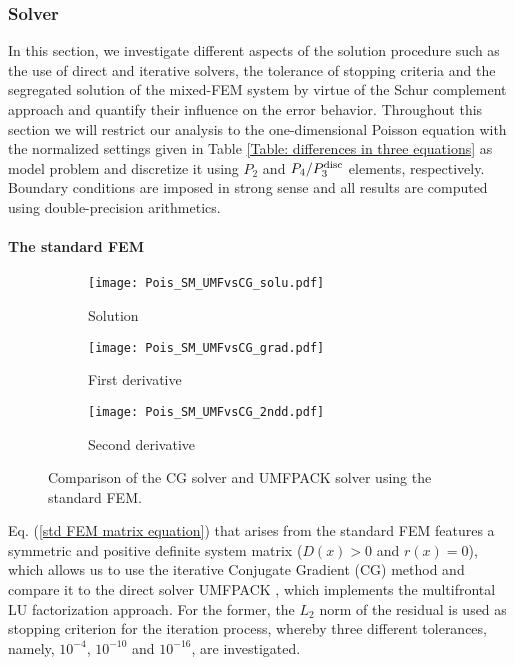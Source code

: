 \documentclass[final,3p]{elsarticle}
\begin{document}
\subsubsection{Solver}		\label{Influence_solver}

In this section, we investigate different aspects of the solution procedure such as the use of direct and iterative solvers, the tolerance of stopping criteria and the segregated solution of the mixed-FEM system by virtue of the Schur complement approach and quantify their influence on the error behavior. Throughout this section we will restrict our analysis to the one-dimensional Poisson equation with the normalized settings given in Table \ref{Table: differences in three equations} as model problem and discretize it using $P_2$ and $P_4/P_3^{\rm disc}$ elements, respectively. Boundary conditions are imposed in strong sense and all results are computed using double-precision arithmetics.

\paragraph{The standard FEM}

\begin{figure}[!ht]
    \begin{subfigure}{5.5cm}
        \texttt{[image: Pois\_SM\_UMFvsCG\_solu.pdf]}
        \caption{Solution}
        \label{Fig:Pois_SM_UMFvsCG_solu}
    \end{subfigure}
    \begin{subfigure}{5.5cm}
        \texttt{[image: Pois\_SM\_UMFvsCG\_grad.pdf]}
        \caption{First derivative}
        \label{Fig:Pois_SM_UMFvsCG_grad}
    \end{subfigure}
    \begin{subfigure}{5.5cm}
        \texttt{[image: Pois\_SM\_UMFvsCG\_2ndd.pdf]}
        \caption{Second derivative}
        \label{Fig:Pois_SM_UMFvsCG_2ndd}
    \end{subfigure}
\caption{Comparison of the CG solver and UMFPACK solver using the standard FEM.}
\label{Fig:Pois_SM_UMFvsCG}
\end{figure}

Eq. (\ref{std FEM matrix equation}) that arises from the standard FEM features a symmetric and positive definite system matrix ($D(x)>0$ and $r(x)=0$), which allows us to use the iterative Conjugate Gradient (CG) method \citep{ginsburg1963cg} and compare it to the direct solver UMFPACK \citep{davis2004algorithm}, which implements the multifrontal LU factorization approach. For the former, the $L_2$ norm of the residual is used as stopping criterion for the iteration process, whereby three different tolerances, namely, $10^{-4}$, $10^{-10}$ and $10^{-16}$, are investigated.
\end{document}
